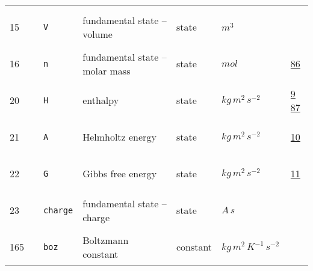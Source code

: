 \begin{longtable}{|p{1cm}|p{2.5cm}|p{4.5cm}|p{8cm}|p{3.0cm}|p{3cm}|p{1cm}|}
             & \\
        15
             & \hypertarget{"v:15"}{ $ {} $}
             & \verb|V|
             & fundamental state -- volume
             & \begin{lay}state \end{lay}
             & $ m^{3} \, $
             & \\
        16
             & \hypertarget{"v:16"}{ $ {} $}
             & \verb|n|
             & fundamental state -- molar mass
             & \begin{lay}state \end{lay}
             & $ mol \, $
             &                 \hyperlink{"e:86"}{ 86 }
                 \\
        20
             & \hypertarget{"v:20"}{ $ {} $}
             & \verb|H|
             & enthalpy
             & \begin{lay}state \end{lay}
             & $ kg \,m^{2} \,s^{-2} \, $
             &                 \hyperlink{"e:9"}{ 9 }
                                 \hyperlink{"e:87"}{ 87 }
                 \\
        21
             & \hypertarget{"v:21"}{ $ {} $}
             & \verb|A|
             & Helmholtz energy
             & \begin{lay}state \end{lay}
             & $ kg \,m^{2} \,s^{-2} \, $
             &                 \hyperlink{"e:10"}{ 10 }
                 \\
        22
             & \hypertarget{"v:22"}{ $ {} $}
             & \verb|G|
             & Gibbs free energy
             & \begin{lay}state \end{lay}
             & $ kg \,m^{2} \,s^{-2} \, $
             &                 \hyperlink{"e:11"}{ 11 }
                 \\
        23
             & \hypertarget{"v:23"}{ $ {} $}
             & \verb|charge|
             & fundamental state -- charge
             & \begin{lay}state \end{lay}
             & $ A \,s \, $
             & \\
        165
             & \hypertarget{"v:165"}{ $ {} $}
             & \verb|boz|
             & Boltzmann constant
             & \begin{lay}constant \end{lay}
             & $ kg \,m^{2} \,K^{-1} \,s^{-2} \, $

\end{longtable}
